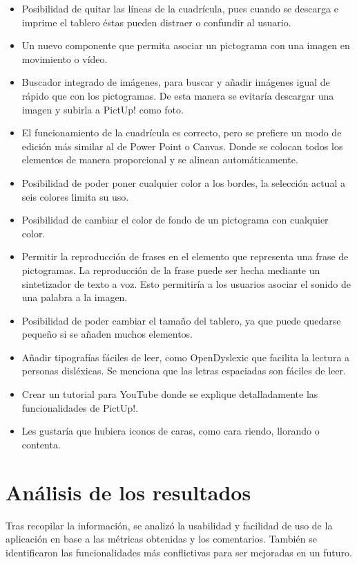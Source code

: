 \begin{itemize}
	\item Posibilidad de quitar las líneas de la cuadrícula, pues cuando se descarga e imprime el tablero éstas pueden distraer o confundir al usuario.  
	\item Un nuevo componente que permita asociar un pictograma con una imagen en movimiento o vídeo.
		\item Buscador integrado de imágenes, para buscar y añadir imágenes igual de rápido que con los pictogramas. De esta manera se evitaría descargar una imagen y subirla a PictUp! como foto. 
	\item El funcionamiento de la cuadrícula es correcto, pero se prefiere un modo de edición más similar al de Power Point o Canvas. Donde se colocan todos los elementos de manera proporcional y se alinean automáticamente.
	\item Posibilidad de poder poner cualquier color a los bordes, la selección actual a seis colores limita su uso.
	\item Posibilidad de cambiar el color de fondo de un pictograma con cualquier color. 
	\item Permitir la reproducción de frases en el elemento que representa una frase de pictogramas. La reproducción de la frase puede ser hecha mediante un sintetizador de texto a voz. Esto permitiría a los usuarios asociar el sonido de una palabra a la imagen.
	\item Posibilidad de poder cambiar el tamaño del tablero, ya que puede quedarse pequeño si se añaden muchos elementos.
	\item Añadir tipografías fáciles de leer, como OpenDyslexic que facilita la lectura a personas disléxicas. Se menciona que las letras espaciadas son fáciles de leer. 
	\item Crear un tutorial para YouTube donde se explique detalladamente las funcionalidades de PictUp!. 
	\item Les gustaría que hubiera iconos de caras, como cara riendo, llorando o contenta. 
\end{itemize}






\section{Análisis de los resultados}
\label{eva:analisis}


Tras recopilar la información, se analizó la usabilidad y facilidad de uso de la aplicación en base a las métricas obtenidas y los comentarios. También se identificaron las funcionalidades más conflictivas para ser mejoradas en un futuro. 

